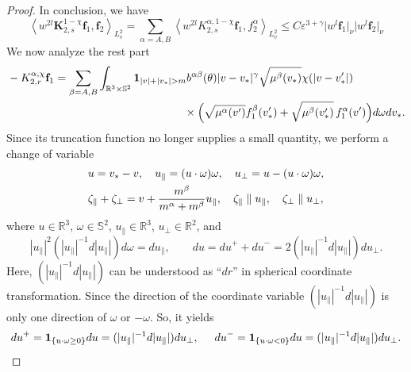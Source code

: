 \documentclass[reqno]{amsart}
\numberwithin{equation}{section}
\numberwithin{equation}{section}
\begin{document}
\begin{proof}
		‌In conclusion‌, we have
		\begin{equation}\label{lem22cclssig}
		\left \langle  w^{2l}\mathbf{K}_{2,s}^{1-\chi}\mathbf{f}_1,\mathbf{f}_2\right \rangle_{L^{2}_{v}}=	\sum_{\alpha=A,B}\left \langle  w^{2l}K_{2,s}^{\alpha,1-\chi}\mathbf{f}_1,f^{\alpha}_2\right \rangle_{L^{2}_{v}} \leq C \varepsilon^{3+\gamma} \big|w^{l} \mathbf{f}_1\big|_\nu \big|w^{l} \mathbf{f}_2\big|_\nu
		\end{equation}
		We now analyze the rest part  
		\begin{equation}\label{lem22K2schimainf}
			\begin{split}
				&	 -K_{2,r}^{\alpha,\chi} \mathbf{f}_1=   \sum_{\beta=A,B} \int_{\mathbb{R}^3 \times \mathbb{S}^2}\mathbf{1}_{|v|+|v_*|>m}
				b^{ \alpha \beta}(\theta)|v-v_*|^{\gamma} \sqrt{\mu^\beta(v_*)}\chi(|v-v_*'|)\\ & \hspace{5.6cm}\times\Big(\sqrt{\mu^\alpha(v')}f^\beta_1(v_*')
				 +\sqrt{\mu^{\beta}(v_*')} \, f^\alpha_1(v')\Big)d\omega dv_*.
			\end{split}	
		\end{equation}	
		Since its truncation function no longer supplies a small quantity, we perform a change of variable
		\begin{align}
			&u=v_*-v,\quad u_{\parallel} = (u \cdot \omega)\omega, \quad 
			u_{\perp} = u - (u \cdot \omega)\omega,  \notag\\
			&\zeta_{\parallel} + \zeta_{\perp} = v + \frac{m^{\beta}}{m^{\alpha}+m^{\beta}}u_{\parallel}, \quad 
			\zeta_{\parallel} \parallel u_{\parallel}, \quad \zeta_{\perp} \parallel u_{\perp},\label{CE2ESYCGV}
		\end{align}
		where $u \in \mathbb{R}^3$, $\omega \in \mathbb{S}^2$, $u_{\parallel} \in \mathbb{R}^3$, $u_{\perp} \in \mathbb{R}^2$, and
		\begin{equation*}
			|u_{\parallel}|^{2}(|u_{\parallel}|^{-1}d|u_{\parallel}|)d\omega = du_{\parallel} ,\qquad du ={du}^{+}+{du}^{-} =2(|u_{\parallel}|^{-1} d|u_{\parallel}|) du_{\perp}. 
		\end{equation*}
		Here, $(|u_{\parallel}|^{-1}d|u_{\parallel}|)$ can be understood as ``$dr$'' in spherical coordinate transformation. Since the direction of the coordinate variable $(|u_{\parallel}|^{-1}d|u_{\parallel}|)$ is only one direction of $\omega$ or $-\omega$. So, it yields
		\begin{equation*}
			{du}^{+}=  \mathbf{1}_{\{u\cdot\omega\geq0\}}du=(|u_{\parallel}|^{-1} d|u_{\parallel}|) du_{\perp},\hspace{0.5cm} {du}^{-}= \mathbf{1}_{\{u\cdot\omega<0\}} du=(|u_{\parallel}|^{-1} d|u_{\parallel}|) du_{\perp}.

\end{equation*}
\end{proof}
\end{document}
